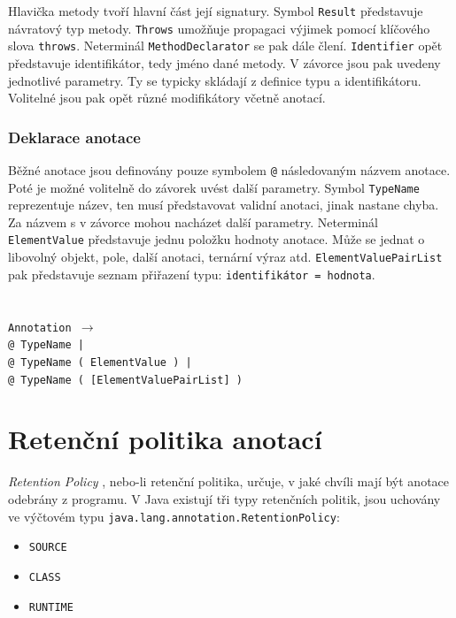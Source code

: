 				Hlavička metody tvoří hlavní část její signatury. Symbol \texttt{Result} představuje návratový typ metody. \texttt{Throws} umožňuje propagaci výjimek pomocí klíčového slova \texttt{throws}. Neterminál \texttt{MethodDeclarator} se pak dále člení. \texttt{Identifier} opět představuje identifikátor, tedy jméno dané metody. V závorce jsou pak uvedeny jednotlivé parametry. Ty se typicky skládají z definice typu a identifikátoru. Volitelné jsou pak opět různé modifikátory včetně anotací.	
 		
			\subsubsection{Deklarace anotace} 
				Běžné anotace jsou definovány pouze symbolem \texttt{@} následovaným názvem anotace. Poté je možné volitelně do závorek uvést další parametry. Symbol \texttt{TypeName} reprezentuje název, ten musí představovat validní anotaci, jinak nastane chyba. Za názvem s v závorce mohou nacházet další parametry. Neterminál \texttt{ElementValue} představuje jednu položku hodnoty anotace. Může se jednat o libovolný objekt, pole, další anotaci, ternární výraz atd. \texttt{ElementValuePairList} pak představuje seznam přiřazení typu: \texttt{identifikátor = hodnota}.\\\\\\
				\- \- \- \- \- \- \texttt{Annotation $\rightarrow$}\\
				\- \- \- \- \- \- \- \- \- \- \- \- \texttt{\textcolor{pblue}{@} TypeName |}\\
				\- \- \- \- \- \- \- \- \- \- \- \- \texttt{\textcolor{pblue}{@} TypeName ( ElementValue ) |}\\
				\- \- \- \- \- \- \- \- \- \- \- \- \texttt{\textcolor{pblue}{@} TypeName ( [ElementValuePairList] )}\\		
	
	\section{Retenční politika anotací}		
				\emph{Retention Policy} \cite{retentionPolicy}, nebo-li retenční politika, určuje, v jaké chvíli mají být anotace odebrány z programu. V Java existují tři typy retenčních politik, jsou uchovány ve výčtovém typu \texttt{java.lang.annotation.RetentionPolicy}: 
					
					\begin{itemize}
						\item \texttt{SOURCE}
						\item \texttt{CLASS}
						\item \texttt{RUNTIME}
					\end{itemize}
					
